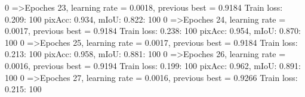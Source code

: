   0%
=>Epoches 23, learning rate = 0.0018,                 previous best = 0.9184
Train loss: 0.209: 100%
pixAcc: 0.934, mIoU: 0.822: 100%
  0%
=>Epoches 24, learning rate = 0.0017,                 previous best = 0.9184
Train loss: 0.238: 100%
pixAcc: 0.954, mIoU: 0.870: 100%
  0%
=>Epoches 25, learning rate = 0.0017,                 previous best = 0.9184
Train loss: 0.213: 100%
pixAcc: 0.958, mIoU: 0.881: 100%
  0%
=>Epoches 26, learning rate = 0.0016,                 previous best = 0.9194
Train loss: 0.199: 100%
pixAcc: 0.962, mIoU: 0.891: 100%
  0%
=>Epoches 27, learning rate = 0.0016,                 previous best = 0.9266
Train loss: 0.215: 100%
